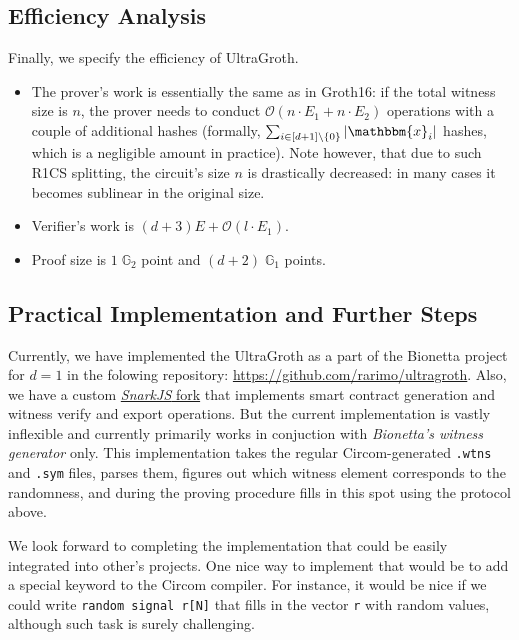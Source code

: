 \documentclass[../../book]{subfiles}
\begin{document}
\subsection{Efficiency Analysis}

Finally, we specify the efficiency of UltraGroth.
\begin{itemize}
    \item The prover's work is essentially the same as in Groth16: if the total witness size is $n$, the prover needs to conduct $\mathcal{O}(n \cdot E_1 + n \cdot E_2)$ operations with a couple of additional hashes (formally, $\sum_{i \in [d+1] \setminus \{0\}}|\mathbbm{x}_i|$ hashes, which is a negligible amount in practice). Note however, that due to such R1CS splitting, the circuit's size $n$ is drastically decreased: in many cases it becomes sublinear in the original size.
    \item Verifier's work is $(d+3)E+\mathcal{O}(l \cdot E_1)$.
    \item Proof size is $1\;\mathbb{G}_2$ point and $(d+2)\;\mathbb{G}_1$ points.
\end{itemize}

\subsection{Practical Implementation and Further Steps}

Currently, we have implemented the UltraGroth as a part of the Bionetta project
for $d=1$ in the folowing repository:
\url{https://github.com/rarimo/ultragroth}. Also, we have a custom
\href{https://github.com/rarimo/ultragroth-snarkjs}{\textit{SnarkJS} fork} that
implements smart contract generation and witness verify and export operations.
But the current implementation is vastly inflexible and currently primarily
works in conjuction with \textit{Bionetta's witness generator} only. This
implementation takes the regular Circom-generated \texttt{.wtns} and
\texttt{.sym} files, parses them, figures out which witness element corresponds
to the randomness, and during the proving procedure fills in this spot using the
protocol above. 

We look forward to completing the implementation that could be easily integrated
into other's projects. One nice way to implement that would be to add a special
keyword to the Circom compiler. For instance, it would be nice if we could write
\texttt{random signal r[N]} that fills in the vector \texttt{r} with random
values, although such task is surely challenging.
\end{document}
